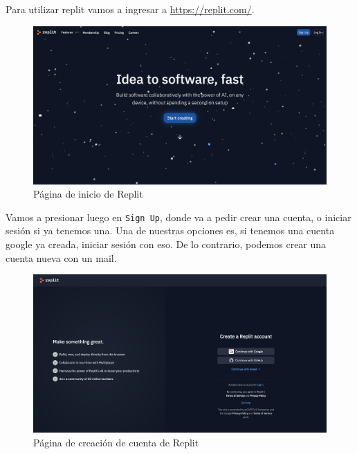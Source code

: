 \documentclass[
  letterpaper,
  DIV=11,
  numbers=noendperiod]{scrreprt}
\begin{document}
Para utilizar replit vamos a ingresar a \url{https://replit.com/}.\\

\begin{figure}

{\centering \includegraphics{./imgs/unidad_1/replit_start.png}

}

\caption{Página de inicio de Replit}

\end{figure}

Vamos a presionar luego en \texttt{Sign\ Up}, donde va a pedir crear una
cuenta, o iniciar sesión si ya tenemos una. Una de nuestras opciones es,
si tenemos una cuenta google ya creada, iniciar sesión con eso. De lo
contrario, podemos crear una cuenta nueva con un mail.

\begin{figure}

{\centering \includegraphics{./imgs/unidad_1/replit_signup.png}

}

\caption{Página de creación de cuenta de Replit}

\end{figure}
\end{document}
